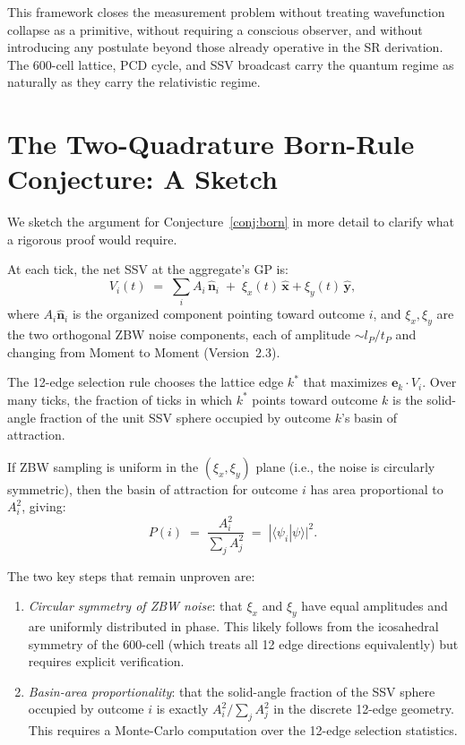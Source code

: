\documentclass[12pt]{article}
\newcommand{\lP}{l_P}
\newcommand{\tP}{t_P}
\begin{document}
This framework closes the measurement problem without treating wavefunction
collapse as a primitive, without requiring a conscious observer, and without
introducing any postulate beyond those already operative in the SR derivation.
The 600-cell lattice, PCD cycle, and SSV broadcast carry the quantum regime
as naturally as they carry the relativistic regime.

\appendix
\section{The Two-Quadrature Born-Rule Conjecture: A Sketch}
\label{app:born}

We sketch the argument for Conjecture~\ref{conj:born} in more detail to
clarify what a rigorous proof would require.

At each tick, the net SSV at the aggregate's GP is:
\begin{equation}
  V_i(t) \;=\; \sum_i A_i\,\hat{\mathbf{n}}_i
  \;+\; \xi_x(t)\,\hat{\mathbf{x}} + \xi_y(t)\,\hat{\mathbf{y}},
  \label{eq:netSSV}
\end{equation}
where $A_i\hat{\mathbf{n}}_i$ is the organized component pointing toward
outcome $i$, and $\xi_x, \xi_y$ are the two orthogonal ZBW noise components,
each of amplitude $\sim \lP/\tP$ and changing from Moment to Moment (Version~2.3).

The 12-edge selection rule chooses the lattice edge $k^*$ that maximizes
$\mathbf{e}_k\cdot V_i$.  Over many ticks, the fraction of ticks
in which $k^*$ points toward outcome $k$ is the solid-angle fraction of the
unit SSV sphere occupied by outcome $k$'s basin of attraction.

If ZBW sampling is uniform in the $(\xi_x, \xi_y)$ plane (i.e., the noise
is circularly symmetric), then the basin of attraction for outcome $i$ has
area proportional to $A_i^2$, giving:
\begin{equation}
  P(i) \;=\; \frac{A_i^2}{\sum_j A_j^2}
  \;=\; |\langle\psi_i|\psi\rangle|^2.
  \label{eq:born_sketch}
\end{equation}

The two key steps that remain unproven are:
\begin{enumerate}[noitemsep]
  \item \emph{Circular symmetry of ZBW noise}: that $\xi_x$ and $\xi_y$
    have equal amplitudes and are uniformly distributed in phase.  This
    likely follows from the icosahedral symmetry of the 600-cell (which
    treats all 12 edge directions equivalently) but requires explicit
    verification.
  \item \emph{Basin-area proportionality}: that the solid-angle fraction of
    the SSV sphere occupied by outcome $i$ is exactly $A_i^2/\sum_j A_j^2$
    in the discrete 12-edge geometry.  This requires a Monte-Carlo
    computation over the 12-edge selection statistics.
\end{enumerate}
\end{document}
